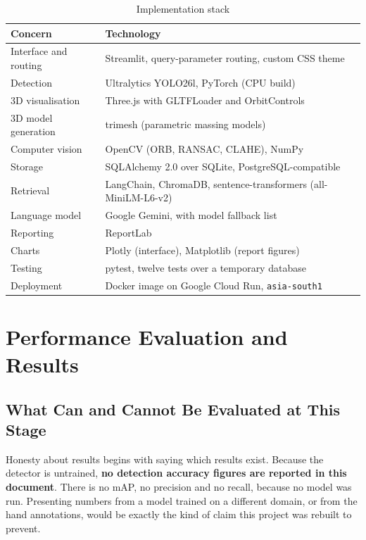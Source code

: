 \documentclass[a4paper,12pt,oneside]{book}
\begin{document}
\begin{table}[H]
\centering
\caption{Implementation stack}
\label{tab:stack}
\renewcommand{\arraystretch}{1.2}
{\footnotesize
\begin{tabular}{|l|l|}
\hline
\textbf{Concern} & \textbf{Technology} \\ \hline
Interface and routing & Streamlit, query-parameter routing, custom CSS theme \\ \hline
Detection & Ultralytics YOLO26l, PyTorch (CPU build) \\ \hline
3D visualisation & Three.js with GLTFLoader and OrbitControls \\ \hline
3D model generation & trimesh (parametric massing models) \\ \hline
Computer vision & OpenCV (ORB, RANSAC, CLAHE), NumPy \\ \hline
Storage & SQLAlchemy 2.0 over SQLite, PostgreSQL-compatible \\ \hline
Retrieval & LangChain, ChromaDB, sentence-transformers (all-MiniLM-L6-v2) \\ \hline
Language model & Google Gemini, with model fallback list \\ \hline
Reporting & ReportLab \\ \hline
Charts & Plotly (interface), Matplotlib (report figures) \\ \hline
Testing & pytest, twelve tests over a temporary database \\ \hline
Deployment & Docker image on Google Cloud Run, \texttt{asia-south1} \\ \hline
\end{tabular}}
\end{table}

\section{Performance Evaluation and Results}

\subsection{What Can and Cannot Be Evaluated at This Stage}
Honesty about results begins with saying which results exist. Because the detector is untrained, \textbf{no detection accuracy figures are reported in this document}. There is no mAP, no precision and no recall, because no model was run. Presenting numbers from a model trained on a different domain, or from the hand annotations, would be exactly the kind of claim this project was rebuilt to prevent.
\end{document}
